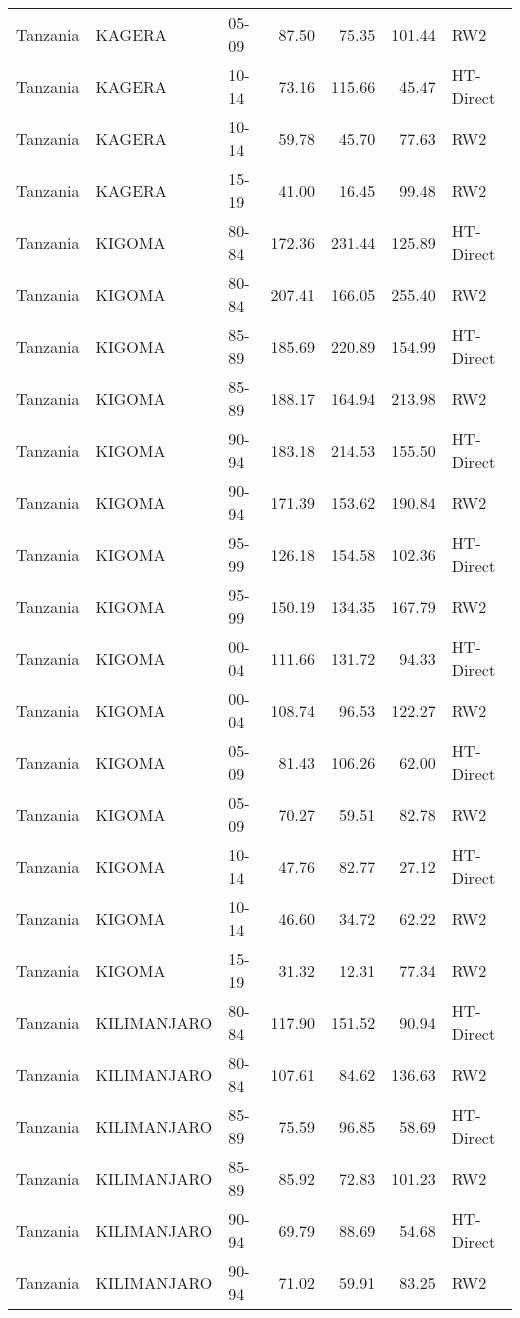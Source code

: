 \begin{longtable}{lllrrrl}
  Tanzania & KAGERA & 05-09 & 87.50 & 75.35 & 101.44 & RW2 \\ 
  Tanzania & KAGERA & 10-14 & 73.16 & 115.66 & 45.47 & HT-Direct \\ 
  Tanzania & KAGERA & 10-14 & 59.78 & 45.70 & 77.63 & RW2 \\ 
  Tanzania & KAGERA & 15-19 & 41.00 & 16.45 & 99.48 & RW2 \\ 
  Tanzania & KIGOMA & 80-84 & 172.36 & 231.44 & 125.89 & HT-Direct \\ 
  Tanzania & KIGOMA & 80-84 & 207.41 & 166.05 & 255.40 & RW2 \\ 
  Tanzania & KIGOMA & 85-89 & 185.69 & 220.89 & 154.99 & HT-Direct \\ 
  Tanzania & KIGOMA & 85-89 & 188.17 & 164.94 & 213.98 & RW2 \\ 
  Tanzania & KIGOMA & 90-94 & 183.18 & 214.53 & 155.50 & HT-Direct \\ 
  Tanzania & KIGOMA & 90-94 & 171.39 & 153.62 & 190.84 & RW2 \\ 
  Tanzania & KIGOMA & 95-99 & 126.18 & 154.58 & 102.36 & HT-Direct \\ 
  Tanzania & KIGOMA & 95-99 & 150.19 & 134.35 & 167.79 & RW2 \\ 
  Tanzania & KIGOMA & 00-04 & 111.66 & 131.72 & 94.33 & HT-Direct \\ 
  Tanzania & KIGOMA & 00-04 & 108.74 & 96.53 & 122.27 & RW2 \\ 
  Tanzania & KIGOMA & 05-09 & 81.43 & 106.26 & 62.00 & HT-Direct \\ 
  Tanzania & KIGOMA & 05-09 & 70.27 & 59.51 & 82.78 & RW2 \\ 
  Tanzania & KIGOMA & 10-14 & 47.76 & 82.77 & 27.12 & HT-Direct \\ 
  Tanzania & KIGOMA & 10-14 & 46.60 & 34.72 & 62.22 & RW2 \\ 
  Tanzania & KIGOMA & 15-19 & 31.32 & 12.31 & 77.34 & RW2 \\ 
  Tanzania & KILIMANJARO & 80-84 & 117.90 & 151.52 & 90.94 & HT-Direct \\ 
  Tanzania & KILIMANJARO & 80-84 & 107.61 & 84.62 & 136.63 & RW2 \\ 
  Tanzania & KILIMANJARO & 85-89 & 75.59 & 96.85 & 58.69 & HT-Direct \\ 
  Tanzania & KILIMANJARO & 85-89 & 85.92 & 72.83 & 101.23 & RW2 \\ 
  Tanzania & KILIMANJARO & 90-94 & 69.79 & 88.69 & 54.68 & HT-Direct \\ 
  Tanzania & KILIMANJARO & 90-94 & 71.02 & 59.91 & 83.25 & RW2 \\ 

\end{longtable}
